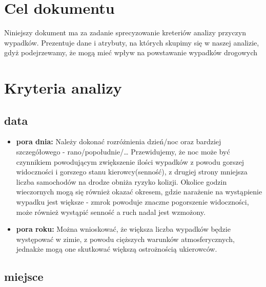 \section{Cel dokumentu}\label{cel-dokumentu}

Niniejszy dokument ma za zadanie sprecyzowanie kreteriów analizy
przyczyn wypadków. Prezentuje dane i atrybuty, na których skupimy się w
naszej analizie, gdyż podejrzewamy, że mogą mieć wpływ na powstawanie
wypadków drogowych

\section{Kryteria analizy}\label{kryteria-analizy}

\subsection{data}\label{data}

\begin{itemize}
\itemsep-14pt\parskip0pt
\item
  \textbf{pora dnia:} Należy dokonać rozróżnienia dzień/noc oraz
  bardziej szczegółowego - rano/popołudnie/\ldots{} Przewidujemy, że noc
  może być czynnikiem powodującym zwiększenie ilości wypadków z powodu
  gorszej widoczności i gorszego stanu kierowcy(senność), z drugiej
  strony mniejsza liczba samochodów na drodze obniża ryzyko kolizji.
  Okolice godzin wieczornych mogą się również okazać okresem, gdzie
  narażenie na wystąpienie wypadku jest większe - zmrok powoduje znaczne
  pogorszenie widoczności, może również wystąpić senność a ruch nadal
  jest wzmożony.\\
\item
  \textbf{pora roku:} Można wnioskować, że większa liczba wypadków
  będzie występować w zimie, z powodu cięższych warunków
  atmosferycznych, jednakże mogą one skutkować większą ostrożnością
  ukierowców.
\end{itemize}

\subsection{miejsce}\label{miejsce}

